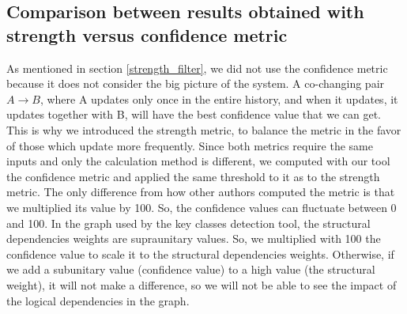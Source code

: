 \documentclass[runningheads]{comsis2}
\begin{document}
\subsection{Comparison between results obtained with strength versus confidence metric}
\label{sec:measure_metrics}


As mentioned in section \ref{strength_filter}, we did not use the confidence metric because it does not consider the big picture of the system.
A co-changing pair $A \rightarrow B$, where A updates only once in the entire history, and when it updates, it updates together with B, will have the best confidence value that we can get. This is why we introduced the strength metric, to balance the metric in the favor of those which update more frequently.
Since both metrics require the same inputs and only the calculation method is different, we computed with our tool the confidence metric and applied the same threshold to it as to the strength metric. The only difference from how other authors computed the metric is that we multiplied its value by 100. So, the confidence values can fluctuate between 0 and 100.
In the graph used by the key classes detection tool, the structural dependencies weights are supraunitary values. So, we multiplied with 100 the confidence value to scale it to the structural dependencies weights. Otherwise, if we add a subunitary value (confidence value) to a high value (the structural weight), it will not make a difference, so we will not be able to see the impact of the logical dependencies in the graph.

\begin{table}[!h]
\setlength\tabcolsep{3.5pt}
\caption{ Average results obtained with strength versus confidence metric.}
\label{tab:confidence_vs_strength}
\centering
{}
\end{table}
\end{document}
